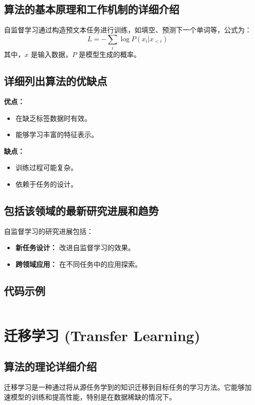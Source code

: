 \subsection*{算法的基本原理和工作机制的详细介绍}
自监督学习通过构造预文本任务进行训练，如填空、预测下一个单词等，公式为：
\[
    L = -\sum_{i} \log P(x_i | x_{<i})
\]
其中，\(x\) 是输入数据，\(P\) 是模型生成的概率。

\subsection*{详细列出算法的优缺点}
\textbf{优点：}
\begin{itemize}
    \item 在缺乏标签数据时有效。
    \item 能够学习丰富的特征表示。
\end{itemize}

\textbf{缺点：}
\begin{itemize}
    \item 训练过程可能复杂。
    \item 依赖于任务的设计。
\end{itemize}

\subsection*{包括该领域的最新研究进展和趋势}
自监督学习的研究进展包括：
\begin{itemize}
    \item \textbf{新任务设计：} 改进自监督学习的效果。
    \item \textbf{跨领域应用：} 在不同任务中的应用探索。
\end{itemize}
\subsection*{代码示例}
\begin{lstlisting}

\end{lstlisting}


\section{迁移学习 (Transfer Learning)}
\subsection*{算法的理论详细介绍}
迁移学习是一种通过将从源任务学到的知识迁移到目标任务的学习方法。它能够加速模型的训练和提高性能，特别是在数据稀缺的情况下。

